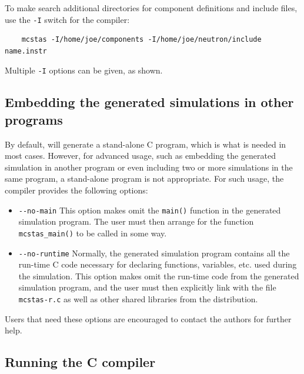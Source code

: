 To make \MCS search additional directories for component definitions
and include files, use the \verb+-I+ switch for the \MCS compiler:
\begin{lstlisting}
    mcstas -I/home/joe/components -I/home/joe/neutron/include name.instr
\end{lstlisting}
Multiple \verb+-I+ options can be given, as shown.


\subsection{Embedding the generated simulations in other programs}

By default, \MCS will generate a stand-alone C program, which is what
is needed in most cases. However, for advanced usage, such as embedding
the generated simulation in another program or even including two or
more simulations in the same program, a stand-alone program is not
appropriate. For such usage, the \MCS compiler provides the following
options:
\begin{itemize}
\item \verb+--no-main+ This option makes \MCS omit the \verb+main()+
  function in the generated simulation program. The user must then
  arrange for the function \verb+mcstas_main()+ to be called in some
  way.
\item \verb+--no-runtime+ Normally, the
  generated simulation program contains all the run-time C code necessary for
  declaring functions, variables, etc. used during the simulation.  This
  option makes \MCS omit the run-time code from the generated
  simulation program, and the user must then explicitly link with the file
  \verb+mcstas-r.c+ as well as other shared libraries from the \MCS{} distribution.
\end{itemize}
Users that need these options are encouraged to contact the authors for
further help.


\subsection{Running the C compiler}
\label{s:compile}

